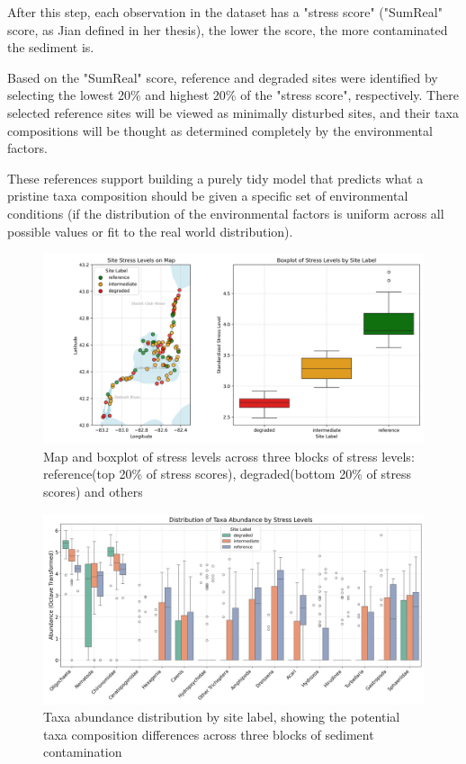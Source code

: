 After this step, each observation in the dataset has a "stress score" ("SumReal" score, as Jian defined in her thesis),
the lower the score, the more contaminated the sediment is.

Based on the "SumReal" score, reference and degraded sites were identified by selecting
the lowest 20\% and highest 20\% of the "stress score", respectively.
There selected reference sites will be viewed as minimally disturbed sites, and 
their taxa compositions will be thought as determined completely by the environmental factors.


These references support building a purely tidy model that predicts what
a pristine taxa composition should be given a specific set of environmental conditions
(if the distribution of the
environmental factors is uniform across all possible values or fit to the real world distribution).

\begin{figure}[!h]
    \centering
    \includegraphics[width=\textwidth]{../results/preliminary_results/stress_levels_map_and_boxplot.png}
    \caption{Map and boxplot of stress levels across three blocks of stress levels: 
    reference(top 20\% of stress scores), degraded(bottom 20\% of stress scores) and others}
    \label{fig:stress_levels_map_and_boxplot}
\end{figure}

\begin{figure}[!h]
    \centering
    \includegraphics[width=\textwidth]{../results/preliminary_results/taxa_abundance_by_site_label.png}
    \caption{Taxa abundance distribution by site label, 
    showing the potential taxa composition differences 
    across three blocks of sediment contamination}
    \label{fig:taxa_abundance_by_site_label}
\end{figure}

